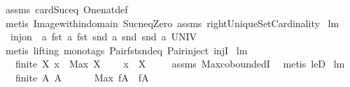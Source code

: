 \begin{isabellebody}
%
\isatagproof
{}\isamarkupfalse%
\ assms\ card{\isacharunderscore}Suc{\isacharunderscore}eq\ One{\isacharunderscore}nat{\isacharunderscore}def\ \ \isanewline
\ \ \isamarkupfalse%
\ {\isacharparenleft}metis\ Image{\isacharunderscore}within{\isacharunderscore}domain{\isacharprime}\ Suc{\isacharunderscore}neq{\isacharunderscore}Zero\ assms\ rightUniqueSetCardinality{\isacharparenright}%
\endisatagproof
{\isafoldproof}%
%
\isadelimproof
\isanewline
%
\endisadelimproof
\isanewline
\isanewline
{}\isamarkupfalse%
\ lm{}{}{}{\isacharcolon}\ \isanewline
\ \ {\isachardoublequoteopen}inj{\isacharunderscore}on\ \ {\isacharparenleft}{\isacharpercent}a{\isachardot}\ {\isacharparenleft}{\isacharparenleft}fst\ a{\isacharcomma}\ fst\ {\isacharparenleft}snd\ a{\isacharparenright}{\isacharparenright}{\isacharcomma}\ snd\ {\isacharparenleft}snd\ a{\isacharparenright}{\isacharparenright}{\isacharparenright}\ UNIV{\isachardoublequoteclose}\ \isanewline
%
\isadelimproof
\ \ %
\endisadelimproof
%
\isatagproof
{}\isamarkupfalse%
\ {\isacharparenleft}metis\ {\isacharparenleft}lifting{\isacharcomma}\ mono{\isacharunderscore}tags{\isacharparenright}\ Pair{\isacharunderscore}fst{\isacharunderscore}snd{\isacharunderscore}eq\ Pair{\isacharunderscore}inject\ injI{\isacharparenright}%
\endisatagproof
{\isafoldproof}%
%
\isadelimproof
\isanewline
%
\endisadelimproof
\isanewline
{}\isamarkupfalse%
\ lm{}{}{}{\isacharcolon}\ \isanewline
\ \ \ {\isachardoublequoteopen}finite\ X{\isachardoublequoteclose}\ {\isachardoublequoteopen}x\ {\isachargreater}\ Max\ X{\isachardoublequoteclose}\ \isanewline
\ \ \ {\isachardoublequoteopen}x\ {\isasymnotin}\ X{\isachardoublequoteclose}\ \isanewline
%
\isadelimproof
\ \ %
\endisadelimproof
%
\isatagproof
{}\isamarkupfalse%
\ assms\ Max{\isachardot}coboundedI\ \isamarkupfalse%
\ {\isacharparenleft}metis\ leD{\isacharparenright}%
\endisatagproof
{\isafoldproof}%
%
\isadelimproof
\isanewline
%
\endisadelimproof
\isanewline
{}\isamarkupfalse%
\ lm{}{}{}{\isacharcolon}\ \isanewline
\ \ \ {\isachardoublequoteopen}finite\ A{\isachardoublequoteclose}\ {\isachardoublequoteopen}A\ {\isasymnoteq}\ {\isacharbraceleft}{\isacharbraceright}{\isachardoublequoteclose}\ \isanewline
\ \ \ {\isachardoublequoteopen}Max\ {\isacharparenleft}f{\isacharbackquote}A{\isacharparenright}\ {\isasymin}\ f{\isacharbackquote}A{\isachardoublequoteclose}\ \isanewline

\end{isabellebody}
